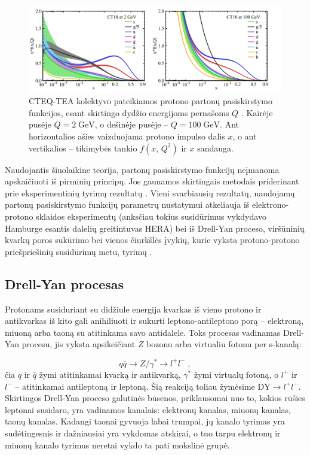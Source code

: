 \documentclass[a4paper, 12pt, oneside]{article}
\newcommand{\DY}{\mathrm{DY}}
\newlength\q
\begin{document}
\begin{figure}[t]
	\includegraphics[width=\linewidth]{CT18_PDF.png}
	\caption{\label{fig:PDFs}
		CTEQ-TEA kolektyvo pateikiamos protono partonų pasiskirstymo funkcijos, esant skirtingo dydžio energijoms pernašoms $Q$ \cite{CTEQ2019}.
		Kairėje pusėje $Q=2 \; \mathrm{GeV}$, o dešinėje pusėje -- $Q=100 \; \mathrm{GeV}$.
		Ant horizontalios ašies vaizduojama protono impulso dalis $x$, o ant vertikalios -- tikimybės tankio $f(x,\, Q^2)$
		ir $x$ sandauga.}
\end{figure}

Naudojantis šiuolaikine teorija, partonų pasiskirstymo funkcijų neįmanoma apskaičiuoti iš pirminių principų.
Jos gaunamos skirtingais metodais priderinant prie eksperimentinių tyrimų rezultatų
\cite{PDF_MMHT2015, PDF_CJ15, NNPDF, PDF_ABMP16, PDF_MMHT2019, CTEQ2019}.
Vieni svarbiausių rezultatų, naudojamų partonų pasiskirstymo funkcijų parametrų nustatymui atkeliauja iš elektrono-protono
sklaidos eksperimentų (anksčiau tokius susidūrimus vykdydavo Hamburge esantis dalelių greitintuvas HERA) bei iš
Drell-Yan proceso, viršūninių kvarkų poros sukūrimo bei vienos čiurkšlės įvykių, kurie vyksta protono-protono priešpriešinių susidūrimų
metu, tyrimų \cite{CTEQ2019}.


\subsection{Drell-Yan procesas}
Protonams susiduriant su didžiule energija kvarkas iš vieno protono ir antikvarkas iš kito gali anihiliuoti ir sukurti leptono-antileptono
porą -- elektroną, miuoną arba taoną su atitinkama savo antidalele.
Toks procesas vadinamas Drell-Yan procesu, jis vyksta apsikeičiant $Z$ bozonu arba virtualiu fotonu per s-kanalą:

\begin{equation*}
	q\bar{q} \rightarrow Z/ \gamma^{*} \rightarrow l^{+}l^{-} \; ,
\end{equation*}
čia $q$ ir $\bar{q}$ žymi atitinkamai kvarką ir antikvarką, $\gamma^*$ žymi virtualų fotoną, o $l^+$ ir $l^-$ -- atitinkamai
antileptoną ir leptoną.
Šią reakciją toliau žymėsime $\DY \! \rightarrow \! l^{+}l^{-}$.
Skirtingos Drell-Yan proceso galutinės būsenos, priklausomai nuo to, kokios rūšies leptonai susidaro, yra
vadinamos kanalais: elektronų kanalas, miuonų kanalas, taonų kanalas.
Kadangi taonai gyvuoja labai trumpai, jų kanalo tyrimas yra sudėtingesnis ir dažniausiai yra vykdomas atskirai,
o tuo tarpu elektronų ir miuonų kanalo tyrimus neretai vykdo ta pati mokslinė grupė.
\end{document}
